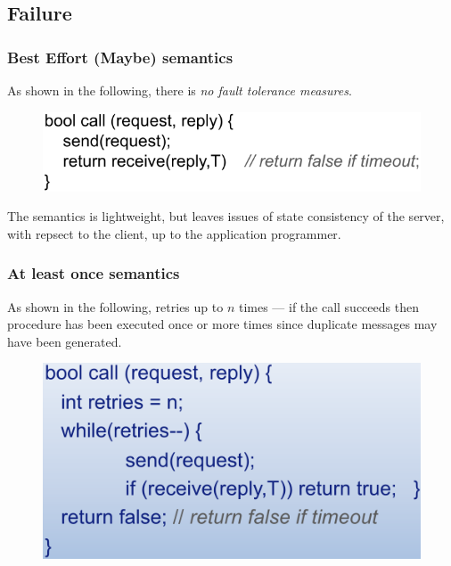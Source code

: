 \documentclass[twocolumn,landscape,10pt]{article}
\theoremstyle{definition}
\begin{document}
\subsection{Failure}

\subsubsection{Best Effort (Maybe) semantics}

As shown in the following, there is \emph{no fault tolerance measures}.

\begin{figure}[h]
  	\includegraphics[scale=0.35]{maybe_semantics.png}
  	\centering
\end{figure}
\noindent The semantics is lightweight, but leaves issues of state consistency of the
server, with repsect to the client, up to the application programmer.


\subsubsection{At least once semantics}

As shown in the following, retries up to $n$ times 
--- if the call succeeds then procedure has been
executed once or more times since duplicate messages may have been generated.

\begin{figure}[h]
  	\includegraphics[scale=0.27]{ato_semantics.png}
  	\centering
\end{figure}
\end{document}
